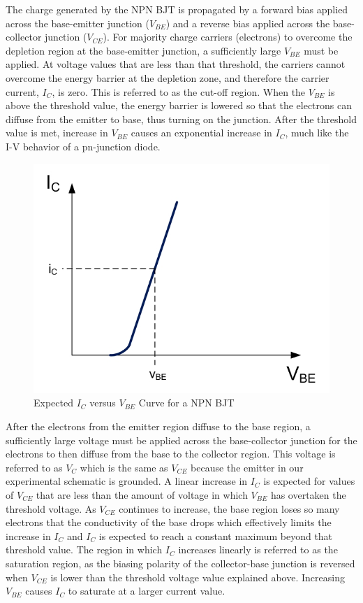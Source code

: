 The charge generated by the  NPN BJT is propagated by a forward bias applied across the base-emitter junction ($V_{BE}$) and a reverse bias applied across the base-collector junction ($V_{CE}$). For majority charge carriers (electrons) to overcome the depletion region at the base-emitter junction, a sufficiently large $V_{BE}$ must be applied. At voltage values that are less than that threshold, the carriers cannot overcome the energy barrier at the depletion zone, and therefore the carrier current, $I_C$, is zero. This is referred to as the cut-off region. When the $V_{BE}$ is above the threshold value, the energy barrier is lowered so that the electrons can diffuse from the emitter to base, thus turning on the junction. After the threshold value is met, increase in $V_{BE}$ causes an exponential increase in $I_C$, much like the I-V behavior of a pn-junction diode.

\FloatBarrier

\begin{figure}[h!]
	\centering
	\includegraphics[scale=3]{./images/bjt_ic_vbe_expected.PNG}
	\caption{Expected $I_C$ versus $V_{BE}$ Curve for a NPN BJT}
	\label{fig:ic_vs_vbe}
\end{figure}

\FloatBarrier

After the electrons from the emitter region diffuse to the base region, a sufficiently large voltage must be applied across the base-collector junction for the electrons to then diffuse from the base to the collector region. This voltage is referred to as $V_C$ which is the same as $V_{CE}$ because the emitter in our experimental schematic is grounded. A linear increase in $I_C$ is expected for values of $V_{CE}$ that are less than the amount of voltage in which $V_{BE}$ has overtaken the threshold voltage. As $V_{CE}$ continues to increase, the base region loses so many electrons that the conductivity of the base drops which effectively limits the increase in $I_C$ and $I_C$ is expected to reach a constant maximum beyond that threshold value. The region in which $I_C$ increases linearly is referred to as the saturation region, as the biasing polarity of the collector-base junction is reversed when $V_{CE}$ is lower than the threshold voltage value explained above. Increasing $V_{BE}$ causes $I_C$ to saturate at a larger current value.

